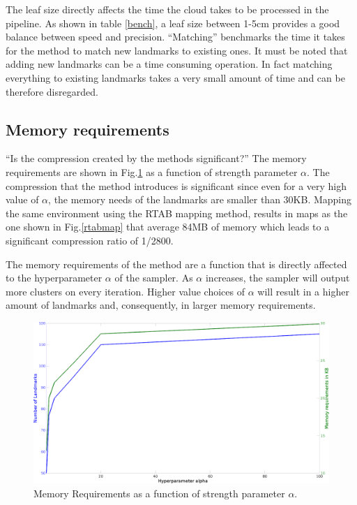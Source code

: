 \documentclass[twoside,hidelinks]{article}
\begin{document}
The leaf size directly affects the time the cloud takes to be processed in the pipeline. As shown in table \ref{bench}, a leaf size between 1-5cm provides a good balance between speed and precision. ``Matching'' benchmarks the time it takes for the method to match new landmarks to existing ones. It must be noted that adding new landmarks can be a time consuming operation. In fact matching everything to existing landmarks takes a very small amount of time and can be therefore disregarded.

\subsection{Memory requirements}
\label{reqs}
``Is the compression created by the methods significant?''
The memory requirements are shown in Fig.\ref{memReq} as a function of strength parameter $\alpha$. The compression that the method introduces is significant since even for a very high value of $\alpha$, the memory needs of the landmarks are smaller than 30KB. Mapping the same environment using the RTAB mapping method, results in maps as the one shown in Fig.\ref{rtabmap} that average 84MB of memory which leads to a significant compression ratio of 1/2800.

The memory requirements of the method are a function that is directly affected to the hyperparameter $\alpha$ of the sampler. As $\alpha$ increases, the sampler will output more clusters on every iteration. Higher value choices of $\alpha$ will result in a higher amount of landmarks and, consequently, in larger memory requirements.

\begin{figure}[ht!]
  \centering
    \includegraphics[width=.8\textwidth]{memoryRequirements2}
    \caption{Memory Requirements as a function of strength parameter $\alpha$.}
  \label{memReq}
\end{figure}
\end{document}
